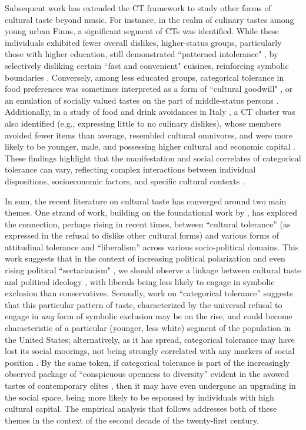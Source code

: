 \documentclass[12pt]{article}
\begin{document}
Subsequent work has extended the CT framework to study other forms of cultural taste beyond music. For instance, in the realm of culinary tastes among young urban Finns, a significant segment of CTs was identified. While these individuals exhibited fewer overall dislikes, higher-status groups, particularly those with higher education, still demonstrated ``patterned intolerance" \citep{bryson1996anything-311}, by selectively disliking certain ``fast and convenient" cuisines, reinforcing symbolic boundaries \citep{lindblom2019anything-530}. Conversely, among less educated groups, categorical tolerance in food preferences was sometimes interpreted as a form of ``cultural goodwill" \citep{bourdieu1984distinction-835}, or an emulation of socially valued tastes on the part of middle-status persons \citep{lindblom2019anything-530}. Additionally, in a study of food and drink avoidances in Italy \citep{oncini2023cultural-323}, a CT cluster was also identified (e.g., expressing little to no culinary dislikes), whose members avoided fewer items than average, resembled cultural omnivores, and were more likely to be younger, male, and possessing higher cultural and economic capital \citep{oncini2023cultural-323}. These findings highlight that the manifestation and social correlates of categorical tolerance can vary, reflecting complex interactions between individual dispositions, socioeconomic factors, and specific cultural contexts \citep{lindblom2019anything-530, oncini2023cultural-323}.

In sum, the recent literature on cultural taste has converged around two main themes. One strand of work, building on the foundational work by \citep{bryson1996anything-311}, has explored the connection, perhaps rising in recent times, between ``cultural tolerance'' (as expressed in the refusal to dislike other cultural forms) and various forms of attitudinal tolerance and ``liberalism'' across various socio-political domains. This work suggests that in the context of increasing political polarization and even rising political ``sectarianism" \citep{finkel2020political-78d}, we should observe a linkage between cultural taste and political ideology \citep{rawlings2023polarization-0af}, with liberals being less likely to engage in symbolic exclusion than conservatives. Secondly, work on ``categorical tolerance'' suggests that this particular pattern of taste, characterized by the universal refusal to engage in \textit{any} form of symbolic exclusion may be on the rise, and could become characteristic of a particular (younger, less white) segment of the population in the United States; alternatively, as it has spread, categorical tolerance may have lost its social moorings, not being strongly correlated with any markers of social position \citep{lindblom2022growing-ded}. By the same token, if categorical tolerance is part of the increasingly observed package of ``conspicuous openness to diversity'' evident in the avowed tastes of contemporary elites \citep{ollivier2008modes-96f}, then it may have even undergone an upgrading in the social space, being more likely to be espoused by individuals with high cultural capital. The empirical analysis that follows addresses both of these themes in the context of the second decade of the twenty-first century. 
\end{document}
